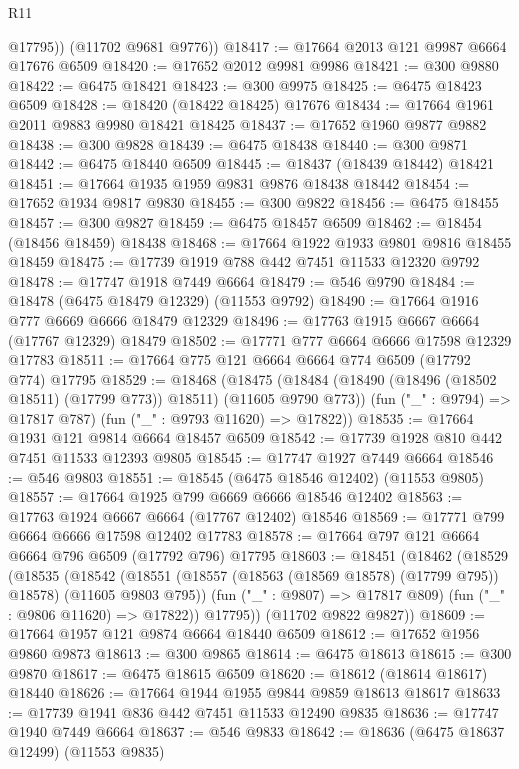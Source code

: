 \begin{lexlean}{R11}
\begin{coremodule}
          @17795))
      (@11702 @9681 @9776))
@18417 := @17664 @2013 @121 @9987 @6664 @17676 @6509
@18420 := @17652 @2012 @9981 @9986
@18421 := @300 @9880
@18422 := @6475 @18421
@18423 := @300 @9975
@18425 := @6475 @18423 @6509
@18428 := @18420 (@18422 @18425) @17676
@18434 := @17664 @1961 @2011 @9883 @9980 @18421 @18425
@18437 := @17652 @1960 @9877 @9882
@18438 := @300 @9828
@18439 := @6475 @18438
@18440 := @300 @9871
@18442 := @6475 @18440 @6509
@18445 := @18437 (@18439 @18442) @18421
@18451 := @17664 @1935 @1959 @9831 @9876 @18438 @18442
@18454 := @17652 @1934 @9817 @9830
@18455 := @300 @9822
@18456 := @6475 @18455
@18457 := @300 @9827
@18459 := @6475 @18457 @6509
@18462 := @18454 (@18456 @18459) @18438
@18468 := @17664 @1922 @1933 @9801 @9816 @18455 @18459
@18475 := @17739 @1919 @788 @442 @7451 @11533 @12320 @9792
@18478 := @17747 @1918 @7449 @6664
@18479 := @546 @9790
@18484 := @18478 (@6475 @18479 @12329) (@11553 @9792)
@18490 := @17664 @1916 @777 @6669 @6666 @18479 @12329
@18496 := @17763 @1915 @6667 @6664 (@17767 @12329) @18479
@18502 := @17771 @777 @6664 @6666 @17598 @12329 @17783
@18511 := @17664 @775 @121 @6664 @6664 @774 @6509 (@17792 @774) @17795
@18529 := @18468
    (@18475
      (@18484 (@18490 (@18496 (@18502 @18511) (@17799 @773)) @18511) (@11605 @9790 @773))
      (fun ("_" : @9794) => @17817 @787)
      (fun ("_" : @9793 @11620) => @17822))
@18535 := @17664 @1931 @121 @9814 @6664 @18457 @6509
@18542 := @17739 @1928 @810 @442 @7451 @11533 @12393 @9805
@18545 := @17747 @1927 @7449 @6664
@18546 := @546 @9803
@18551 := @18545 (@6475 @18546 @12402) (@11553 @9805)
@18557 := @17664 @1925 @799 @6669 @6666 @18546 @12402
@18563 := @17763 @1924 @6667 @6664 (@17767 @12402) @18546
@18569 := @17771 @799 @6664 @6666 @17598 @12402 @17783
@18578 := @17664 @797 @121 @6664 @6664 @796 @6509 (@17792 @796) @17795
@18603 := @18451
    (@18462
      (@18529
        (@18535
          (@18542
            (@18551 (@18557 (@18563 (@18569 @18578) (@17799 @795)) @18578) (@11605 @9803 @795))
            (fun ("_" : @9807) => @17817 @809)
            (fun ("_" : @9806 @11620) => @17822))
          @17795))
      (@11702 @9822 @9827))
@18609 := @17664 @1957 @121 @9874 @6664 @18440 @6509
@18612 := @17652 @1956 @9860 @9873
@18613 := @300 @9865
@18614 := @6475 @18613
@18615 := @300 @9870
@18617 := @6475 @18615 @6509
@18620 := @18612 (@18614 @18617) @18440
@18626 := @17664 @1944 @1955 @9844 @9859 @18613 @18617
@18633 := @17739 @1941 @836 @442 @7451 @11533 @12490 @9835
@18636 := @17747 @1940 @7449 @6664
@18637 := @546 @9833
@18642 := @18636 (@6475 @18637 @12499) (@11553 @9835)

\end{coremodule}
\end{lexlean}
